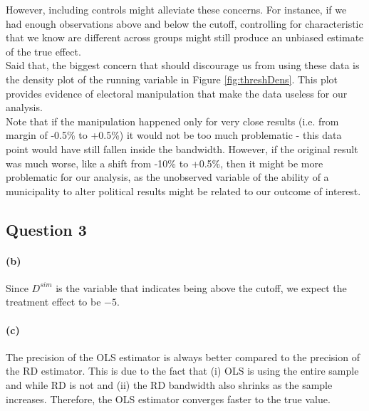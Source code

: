 \documentclass{scrartcl}
\begin{document}
However, including controls might alleviate these concerns. For instance, if we had enough observations above and below the cutoff, controlling for characteristic that we know are different across groups might still produce an unbiased estimate of the true effect. \\

Said that, the biggest concern that should discourage us from using these data is the density plot of the running variable in Figure \ref{fig:threshDens}. This plot provides evidence of electoral manipulation that make the data useless for our analysis. \\ 

Note that if the manipulation happened only for very close results (i.e. from margin of -0.5\% to +0.5\%) it would not be too much problematic - this data point would have still fallen inside the bandwidth. However, if the original result was much worse, like a shift from -10\% to +0.5\%, then it might be more problematic for our analysis, as the unobserved variable of the ability of a municipality to alter political results might be related to our outcome of interest.

\subsection*{Question 3} %


\paragraph*{(b)}
Since $D^{sim}$ is the variable that indicates being above the cutoff, we expect the treatment effect to be $-5$.

\paragraph*{(c)}
The precision of the OLS estimator is always better compared to the precision of the RD estimator. This is due to the fact that (i) OLS is using the entire sample and while RD is not and (ii) the RD bandwidth also shrinks as the sample increases. Therefore, the OLS estimator converges faster to the true value. 
\end{document}
